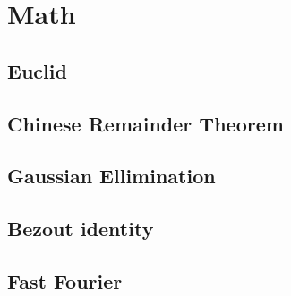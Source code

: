 \newpage
\section{Math}

\subsection{Euclid}
 

\subsection{Chinese Remainder Theorem}
\subsection{Gaussian Ellimination}
\subsection{Bezout identity}
\subsection{Fast Fourier}